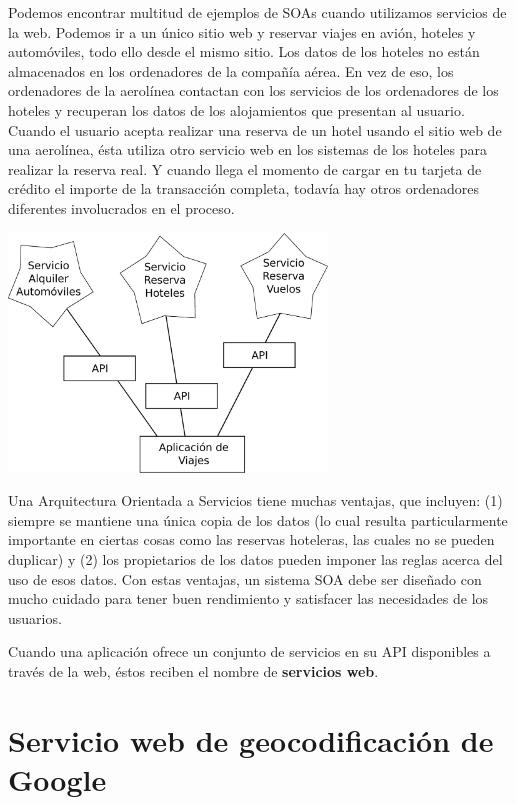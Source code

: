 Podemos encontrar multitud de ejemplos de SOAs cuando utilizamos servicios de la web. Podemos ir a un
único sitio web y reservar viajes en avión, hoteles y automóviles, todo ello desde el
mismo sitio. Los datos de los hoteles no están almacenados en los ordenadores de la
compañía aérea. En vez de eso, los ordenadores de la aerolínea contactan con los servicios
de los ordenadores de los hoteles y recuperan los datos de los alojamientos que presentan al
usuario. Cuando el usuario acepta realizar una reserva de un hotel usando el sitio web
de una aerolínea, ésta utiliza otro servicio web en los sistemas de los hoteles para realizar
la reserva real. Y cuando llega el momento de cargar en tu tarjeta de crédito el importe de la
transacción completa, todavía hay otros ordenadores diferentes involucrados en el proceso.

\beforefig
\centerline{\includegraphics[height=2.50in]{figs2/soa.eps}}
\afterfig

Una Arquitectura Orientada a Servicios tiene muchas ventajas, que incluyen: (1)
siempre se mantiene una única copia de los datos (lo cual resulta particularmente
importante en ciertas cosas como las reservas hoteleras, las cuales no se pueden duplicar)
y (2) los propietarios de los datos pueden imponer las reglas acerca del uso de esos datos.
Con estas ventajas, un sistema SOA debe ser diseñado con mucho cuidado para
tener buen rendimiento y satisfacer las necesidades de los usuarios.

Cuando una aplicación ofrece un conjunto de servicios en su API disponibles a través de la
web, éstos reciben el nombre de {\bf servicios web}.

\section{Servicio web de geocodificación de Google}

